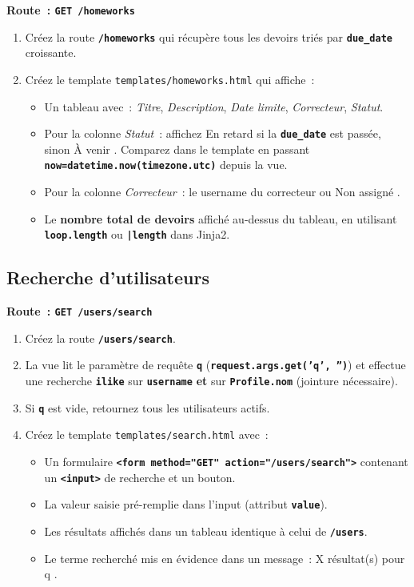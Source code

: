 \documentclass[12pt,a4paper]{article}
\newcommand{\fichier}[1]{\texttt{\textcolor{primary}{#1}}}
\newcommand{\kw}[1]{\texttt{\textbf{#1}}}
\begin{document}
\begin{mdframed}[style=exercice]
\textbf{Route~: \texttt{GET /homeworks}}

\begin{enumerate}[label=\textbf{\arabic*.}]
    \item Créez la route \kw{/homeworks} qui récupère tous les devoirs triés par \kw{due\_date} croissante.
    \item Créez le template \fichier{templates/homeworks.html} qui affiche~:
    \begin{itemize}
        \item Un tableau avec~: \textit{Titre}, \textit{Description}, \textit{Date limite}, \textit{Correcteur}, \textit{Statut}.
        \item Pour la colonne \textit{Statut}~: affichez \og En retard \fg{} si la \kw{due\_date} est passée, sinon \og À venir \fg{}.
          Comparez dans le template en passant \kw{now=datetime.now(timezone.utc)} depuis la vue.
        \item Pour la colonne \textit{Correcteur}~: le username du correcteur ou \og Non assigné \fg{}.
        \item Le \textbf{nombre total de devoirs} affiché au-dessus du tableau, en utilisant \kw{loop.length} ou \kw{|length} dans Jinja2.
    \end{itemize}
\end{enumerate}
\end{mdframed}

\subsection{Recherche d'utilisateurs}

\begin{mdframed}[style=exercice]
\textbf{Route~: \texttt{GET /users/search}}

\begin{enumerate}[label=\textbf{\arabic*.}]
    \item Créez la route \kw{/users/search}.
    \item La vue lit le paramètre de requête \kw{q} (\kw{request.args.get('q', '')}) et effectue une recherche \kw{ilike} sur \kw{username} \textbf{et} sur \kw{Profile.nom} (jointure nécessaire).
    \item Si \kw{q} est vide, retournez tous les utilisateurs actifs.
    \item Créez le template \fichier{templates/search.html} avec~:
    \begin{itemize}
        \item Un formulaire \kw{<form method="GET" action="/users/search">} contenant un \kw{<input>} de recherche et un bouton.
        \item La valeur saisie pré-remplie dans l'input (attribut \kw{value}).
        \item Les résultats affichés dans un tableau identique à celui de \kw{/users}.
        \item Le terme recherché mis en évidence dans un message~: \og X résultat(s) pour \og{}q\fg{} \fg{}.
    \end{itemize}
\end{enumerate}
\end{mdframed}
\end{document}
